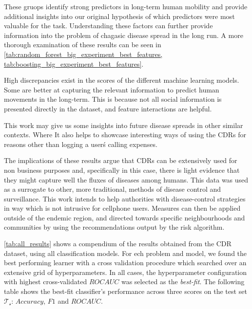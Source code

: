 These gruops identify strong predictors in long-term human mobility and provide additional insights into our original hypothesis of which predictors were most valuable for the task.
Understanding these factors can further provide information into the problem of chagasic disease spread in the long run.
A more thorough examination of these results can be seen in \cref{tab:random_forest_big_experiment_best_features, tab:boosting_big_experiment_best_features}.


High discrepancies exist in the scores of the different machine learning models.
Some are better at capturing the relevant information to predict human movements in the long-term.
This is because not all social information is presented directly in the dataset, and feature interactions are helpful.


This work may give us some insights into future disease spreads in other similar contexts.
Where
It also helps to showcase interesting ways of using the CDRs for reasons other than logging a user\'s calling expenses.



The implications of these results argue that CDRs can be extensively used for non business purposes and, specifically in this case, there is light evidence that they might capture well the fluxes of diseases among humans.
This data was used as a surrogate to other, more traditional, methods of disease control and surveillance.
This work intends to help authorities with disease-control strategies in way which is not intrusive for cellphone users.
Measures can then be applied outside of the endemic region, and directed towards specific neighbourhoods and communities by using the recommendations output by the risk algorithm.


\cref{tab:all_results} shows a compendium of the results obtained from the CDR dataset, using all classification models.
For ech problem and model, we found the best performing learner with a cross validation procedure which searched over an extensive grid of hyperparameters.
In all cases, the hyperparameter configuration with highest cross-validated $ROC AUC$ was selected as the \textit{best-fit}.
The following table shows the best-fit classifier's performance across three scores on the test set $\mathcal{T_s}$: $Accuracy$, $F1$ and $ROC AUC$.

